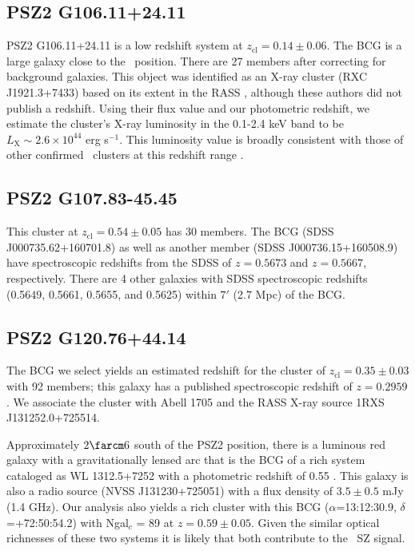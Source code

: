 \documentclass[apj, revtex4-1]{emulateapj}
\begin{document}
\subsection{PSZ2 G106.11+24.11} %
PSZ2 G106.11+24.11 is a low redshift system at $z_\mathrm{cl} = 0.14 \pm 0.06$. The BCG is a large galaxy close to the \planck\ position. There are 27 members after correcting for background galaxies. This object was identified as an X-ray cluster (RXC J1921.3+7433) based on its extent in the RASS \citep{Bohringer2000}, although these authors did not publish a redshift. Using their flux value and our photometric redshift, we estimate the cluster's X-ray luminosity in the 0.1-2.4 keV band to be $L_\mathrm{X} \sim 2.6\times 10^{44}$ erg s$^{-1}$. This luminosity value is broadly consistent with those of other confirmed \planck\ clusters at this redshift range \citep{PlanckCollaboration2015}.

\subsection{PSZ2 G107.83-45.45} %
This cluster at $z_\mathrm{cl} = 0.54 \pm 0.05$ has 30 members. The BCG (SDSS J000735.62+160701.8) as well as another member (SDSS J000736.15+160508.9) have spectroscopic redshifts from the SDSS of $z=0.5673$ and $z=0.5667$, respectively. There are 4 other galaxies with SDSS spectroscopic redshifts (0.5649, 0.5661, 0.5655, and 0.5625) within $7'$ (2.7 Mpc) of the BCG.

\subsection{PSZ2 G120.76+44.14} %
The BCG we select yields an estimated redshift for the cluster of $z_\mathrm{cl} = 0.35 \pm 0.03$ with 92 members; this galaxy has a published spectroscopic redshift of $z=0.2959$ \citep{Huchra1990}. We associate the cluster with Abell 1705 and the RASS X-ray source 1RXS J131252.0+725514.

Approximately $2\farcm6$ south of the PSZ2 position, there is a luminous red galaxy with a gravitationally lensed arc that is the BCG of a rich system cataloged as WL 1312.5+7252 with a photometric redshift of 0.55 \citep{Dahle2003}. This galaxy is also a radio source (NVSS J131230+725051) with a flux density of $3.5 \pm 0.5$ mJy (1.4 GHz). Our analysis also yields a rich cluster with this BCG ($\alpha$=13:12:30.9, $\delta$=+72:50:54.2) with Ngal$_c$ = 89 at $z=0.59 \pm 0.05$. Given the similar optical richnesses of these two systems it is likely that both contribute to the \planck\ SZ signal.
\end{document}
